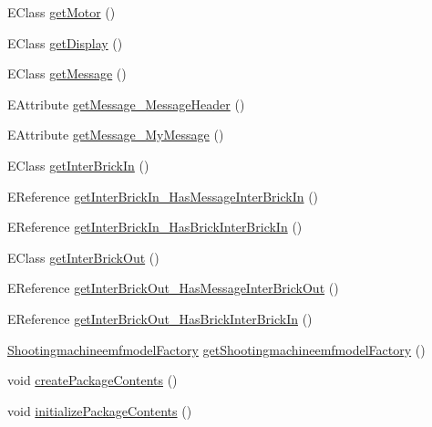 \begin{DoxyCompactItemize}
E\-Class \hyperlink{classshootingmachineemfmodel_1_1impl_1_1_shootingmachineemfmodel_package_impl_a4821ab45885bc62267d5bb70879d0262}{get\-Motor} ()
\item 
E\-Class \hyperlink{classshootingmachineemfmodel_1_1impl_1_1_shootingmachineemfmodel_package_impl_aeb5fff339c8b842a0d511fa06ca98023}{get\-Display} ()
\item 
E\-Class \hyperlink{classshootingmachineemfmodel_1_1impl_1_1_shootingmachineemfmodel_package_impl_ac5110626e0726dd7b9161fc57637d468}{get\-Message} ()
\item 
E\-Attribute \hyperlink{classshootingmachineemfmodel_1_1impl_1_1_shootingmachineemfmodel_package_impl_a343ede636b6e2e081a16ecc59ba37003}{get\-Message\-\_\-\-Message\-Header} ()
\item 
E\-Attribute \hyperlink{classshootingmachineemfmodel_1_1impl_1_1_shootingmachineemfmodel_package_impl_acec8b4cb5d163ae789c807d9d103997a}{get\-Message\-\_\-\-My\-Message} ()
\item 
E\-Class \hyperlink{classshootingmachineemfmodel_1_1impl_1_1_shootingmachineemfmodel_package_impl_acc0e584aa945ef34920ace489b75a971}{get\-Inter\-Brick\-In} ()
\item 
E\-Reference \hyperlink{classshootingmachineemfmodel_1_1impl_1_1_shootingmachineemfmodel_package_impl_ace1298b29c618f089149d5ad5f1caca0}{get\-Inter\-Brick\-In\-\_\-\-Has\-Message\-Inter\-Brick\-In} ()
\item 
E\-Reference \hyperlink{classshootingmachineemfmodel_1_1impl_1_1_shootingmachineemfmodel_package_impl_a422d6d100174ae84491664ec00e0b435}{get\-Inter\-Brick\-In\-\_\-\-Has\-Brick\-Inter\-Brick\-In} ()
\item 
E\-Class \hyperlink{classshootingmachineemfmodel_1_1impl_1_1_shootingmachineemfmodel_package_impl_a8213bce7c3c0e456759def0df96884a9}{get\-Inter\-Brick\-Out} ()
\item 
E\-Reference \hyperlink{classshootingmachineemfmodel_1_1impl_1_1_shootingmachineemfmodel_package_impl_a90e1b2267f6eec8d499aa4128ac1dcc8}{get\-Inter\-Brick\-Out\-\_\-\-Has\-Message\-Inter\-Brick\-Out} ()
\item 
E\-Reference \hyperlink{classshootingmachineemfmodel_1_1impl_1_1_shootingmachineemfmodel_package_impl_a7d3a6526497039853a032e6a950edcdf}{get\-Inter\-Brick\-Out\-\_\-\-Has\-Brick\-Inter\-Brick\-In} ()
\item 
\hyperlink{interfaceshootingmachineemfmodel_1_1_shootingmachineemfmodel_factory}{Shootingmachineemfmodel\-Factory} \hyperlink{classshootingmachineemfmodel_1_1impl_1_1_shootingmachineemfmodel_package_impl_ab21ae664d72223f9534d424615a65cca}{get\-Shootingmachineemfmodel\-Factory} ()
\item 
void \hyperlink{classshootingmachineemfmodel_1_1impl_1_1_shootingmachineemfmodel_package_impl_a22d0d4e8c605fd051bb85c1512217c92}{create\-Package\-Contents} ()
\item 
void \hyperlink{classshootingmachineemfmodel_1_1impl_1_1_shootingmachineemfmodel_package_impl_a61beb648791a57eb0d018c70af85871d}{initialize\-Package\-Contents} ()
\end{DoxyCompactItemize}
